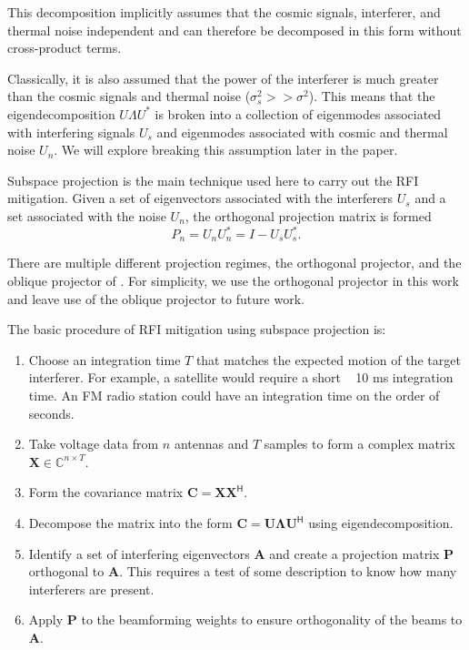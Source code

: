 \documentclass{pas}
\begin{document}
This decomposition implicitly assumes that the cosmic signals, interferer, and thermal noise independent
and can therefore be decomposed in this form without cross-product terms.

Classically, it is also assumed that the power of the interferer is much greater than the cosmic signals and thermal noise ($\sigma^{2}_{s} >> \sigma^{2}$). 
This means that the eigendecomposition $U\Lambda U^{*}$ is broken into a collection of eigenmodes associated with interfering signals $U_{s}$ and eigenmodes associated with cosmic and thermal noise $U_{n}$. 
We will explore breaking this assumption later in the paper.

Subspace projection is the main technique used here to carry out the RFI mitigation. 
Given a set of eigenvectors associated with the interferers $U_{s}$ and a set associated with the noise $U_{n}$,
the orthogonal projection matrix is formed 
\begin{equation}
P_{n}= U_{n}U_{n}^{*} = I - U_{s}U_{s}^{*}.
\end{equation}

There are multiple different projection regimes, the orthogonal projector, and the oblique projector of \cite{hellbourg_oblique_2012}.
For simplicity, we use the orthogonal projector in this work and leave use of the oblique projector
to future work.

The basic procedure of RFI mitigation using subspace projection is:
	\begin{enumerate}
	\item Choose an integration time $T$ that matches the expected motion of the target interferer. For example, a satellite would require a short ~ 10 ms integration time. An FM radio station could have an integration time on the order of seconds.
    \item Take voltage data from $n$ antennas and $T$ samples to form a complex matrix \mbox{$\mathbf{X} \in \mathbb{C}^{n \times T}$}.
    \item Form the covariance matrix \mbox{$\mathbf{C} = \mathbf{X}\mathbf{X}^{\mathsf{H}}$}.
    \item Decompose the matrix into the form \mbox{$\mathbf{C} = \mathbf{U}\mathbf{\Lambda} \mathbf{U}^{\mathsf{H}}$} using eigendecomposition. 	
    \item Identify a set of interfering eigenvectors $\mathbf{A}$ and create a projection matrix $\mathbf{P}$ orthogonal to $\mathbf{A}$. This requires 
    a test of some description to know how many interferers are present.
    \item Apply $\mathbf{P}$ to the beamforming weights to ensure orthogonality of the beams to $\mathbf{A}$.
    \end{enumerate}
\end{document}
